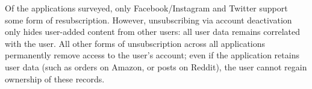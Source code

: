 Of the applications surveyed, only Facebook/Instagram and Twitter support some form of
resubscription. However, unsubscribing via account deactivation only hides user-added content from
other users: all user data remains correlated with the user. All other forms
of unsubscription across all applications permanently remove access to the user's account; even if
the application retains user data (such as orders on Amazon, or posts on Reddit), the user cannot
regain ownership of these records.

%
%
%
%
